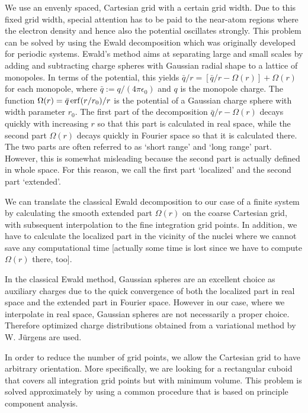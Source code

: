 We use an envenly spaced, Cartesian grid with a certain grid width. Due to this
fixed grid width, special attention has to be paid to the near-atom regions
where the electron density and hence also the potential oscillates strongly.
This problem can be solved by using the Ewald decomposition which was originally
developed for periodic systems. Ewald's method aims at separating large and
small scales by adding and subtracting charge spheres with Gaussian radial shape
to a lattice of monopoles. In terms of the potential, this yields $\bar{q}/r = [
  \bar{q}/r - \Omega(r) ] + \Omega(r)$ for each monopole, where $\bar{q} := q/(4
\pi \epsilon_0)$ and $q$ is the monopole charge. The function $\Omega(r) =
\bar{q}\mathop{\mathrm{erf}}(r/r_0)/r$ is the potential of a Gaussian charge sphere with width
parameter $r_0$. The first part of the decomposition $\bar{q}/r - \Omega(r)$
decays quickly with increasing $r$ so that this part is calculated in real
space, while the second part $\Omega(r)$ decays quickly in Fourier space so that
it is calculated there. The two parts are often referred to as `short range' and
`long range' part. However, this is somewhat misleading because the second part
is actually defined in whole space. For this reason, we call the first part
`localized' and the second part `extended'.

We can translate the classical Ewald decomposition to our case of a finite
system by calculating the smooth extended part $\Omega(r)$ on the coarse
Cartesian grid, with subsequent interpolation to the fine integration grid
points. In addition, we have to calculate the localized part in the vicinity of
the nuclei where we cannot save any computational time [actually some time is
lost since we have to compute $\Omega(r)$ there, too].

In the classical Ewald method, Gaussian spheres are an excellent choice as
auxiliary charges due to the quick convergence of both the localized part in
real space and the extended part in Fourier space. However in our case, where we
interpolate in real space, Gaussian spheres are not necessarily a proper choice.
Therefore optimized charge distributions obtained from a variational method by
W. J\"urgens are used.

In order to reduce the number of grid points, we allow the Cartesian grid to
have arbitrary orientation. More specifically, we are looking for a rectangular
cuboid that covers all integration grid points but with minimum volume. This
problem is solved approximately by using a common procedure that is based on
principle component analysis.



